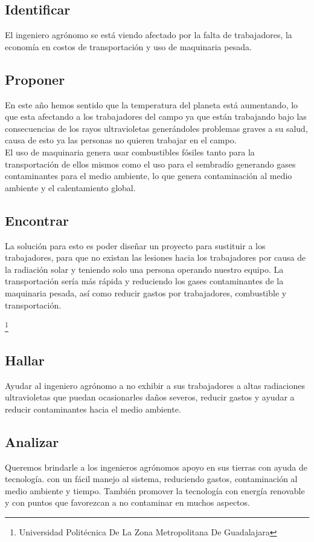 \documentclass[11pt,a4paper]{article}
\begin{document}
\subsection{Identificar}
El ingeniero agrónomo se está viendo afectado por la falta de trabajadores, la economía en costos de transportación y uso de maquinaria pesada.
\subsection{Proponer}
En este año hemos sentido que la temperatura del planeta está aumentando, lo que esta afectando a los trabajadores del campo ya que están trabajando bajo las consecuencias de los rayos ultravioletas generándoles problemas graves a su salud, causa de esto ya las personas no quieren trabajar en el campo.\\
El uso de maquinaria genera usar combustibles fósiles tanto para la transportación de ellos mismos como el uso para el sembradío generando gases contaminantes para el medio ambiente, lo que genera contaminación al medio ambiente y el calentamiento global.
\subsection{Encontrar}
La solución para esto es poder diseñar un proyecto para sustituir a los trabajadores, para que no existan las lesiones hacia los trabajadores por causa de la radiación solar y teniendo solo una persona operando nuestro equipo. La transportación sería más rápida y reduciendo los gases contaminantes de la maquinaria pesada, así como reducir gastos por trabajadores, combustible y transportación.

\footnote{Universidad Politécnica De La Zona Metropolitana De Guadalajara} 
\pagebreak

\subsection{Hallar}
Ayudar al ingeniero agrónomo a no exhibir a sus trabajadores a altas radiaciones ultravioletas que puedan ocasionarles daños severos, reducir gastos y ayudar a reducir contaminantes hacia el medio ambiente.
\subsection{Analizar}
Queremos brindarle a los ingenieros agrónomos apoyo en sus tierras con ayuda de tecnología. con un fácil manejo al sistema, reduciendo gastos, contaminación al medio ambiente y tiempo. También promover la tecnología con energía renovable y con puntos que favorezcan a no contaminar en muchos aspectos.
\end{document}
